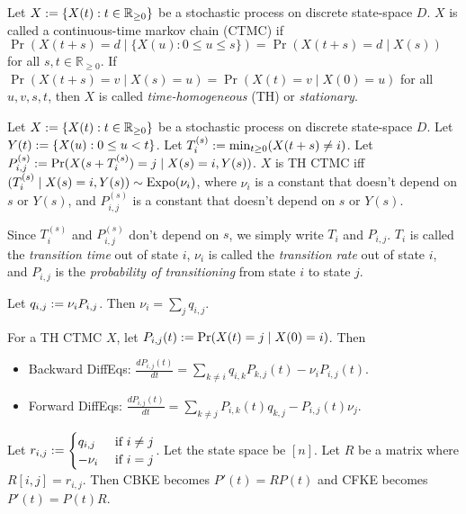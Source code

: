 \documentclass[a4paper, 12pt, fleqn]{article}
\DeclareMathOperator{\Expo}{\opname{Expo}}
\begin{document}
\begin{definition}[CTMC]
Let $X := \{X(t): t \in \mathbb{R}_{\ge 0}\}$ be a stochastic process
on discrete state-space $D$.
$X$ is called a continuous-time markov chain (CTMC) if
$\Pr(X(t+s) = d \mid \{X(u): 0 \le u \le s\}) = \Pr(X(t+s)=d \mid X(s))$
for all $s, t \in \mathbb{R}_{\ge 0}$.
If $\Pr(X(t+s)=v \mid X(s)=u) = \Pr(X(t)=v \mid X(0)=u)$ for all $u, v, s, t$,
then $X$ is called \emph{time-homogeneous} (TH) or \emph{stationary}.
\end{definition}

\begin{theorem}
Let $X := \{X(t): t \in \mathbb{R}_{\ge 0}\}$ be a stochastic process
on discrete state-space $D$. Let $Y(t) := \{X(u): 0 \le u < t \}$.
Let $T_i^{(s)} := \min_{t \ge 0} (X(t+s) \neq i)$.
Let $P^{(s)}_{i,j} := \Pr(X(s+T_i^{(s)})=j \mid X(s)=i, Y(s))$.
$X$ is TH CTMC iff $(T_i^{(s)} \mid X(s)=i, Y(s)) \sim \Expo(\nu_i)$,
where $\nu_i$ is a constant that doesn't depend on $s$ or $Y(s)$,
and $P^{(s)}_{i,j}$ is a constant that doesn't depend on $s$ or $Y(s)$.

Since $T_i^{(s)}$ and $P^{(s)}_{i,j}$ don't depend on $s$, we simply write $T_i$ and $P_{i,j}$.
$T_i$ is called the \emph{transition time} out of state $i$,
$\nu_i$ is called the \emph{transition rate} out of state $i$,
and $P_{i,j}$ is the \emph{probability of transitioning} from state $i$ to state $j$.
\end{theorem}

Let $q_{i,j} := \nu_iP_{i,j}$. Then $\nu_i = \sum_j q_{i,j}$.

\begin{theorem}
For a TH CTMC $X$, let $P_{i,j}(t) := \Pr(X(t)=j \mid X(0)=i)$. Then
\begin{itemize}
\item Backward DiffEqs: $\displaystyle \frac{dP_{i,j}(t)}{dt} = \sum_{k \neq i} q_{i,k}P_{k,j}(t) - \nu_iP_{i,j}(t)$.
\item Forward DiffEqs: $\displaystyle \frac{dP_{i,j}(t)}{dt} = \sum_{k \neq j} P_{i,k}(t)q_{k,j} - P_{i,j}(t)\nu_j$.  \end{itemize}
Let $r_{i,j} := \begin{cases}q_{i,j} & \textrm{ if } i \neq j \\ -\nu_i & \textrm{ if } i = j\end{cases}$.
Let the state space be $[n]$. Let $R$ be a matrix where $R[i,j] = r_{i,j}$.
Then CBKE becomes $P'(t) = RP(t)$ and CFKE becomes $P'(t) = P(t)R$.
\end{theorem}
\end{document}
